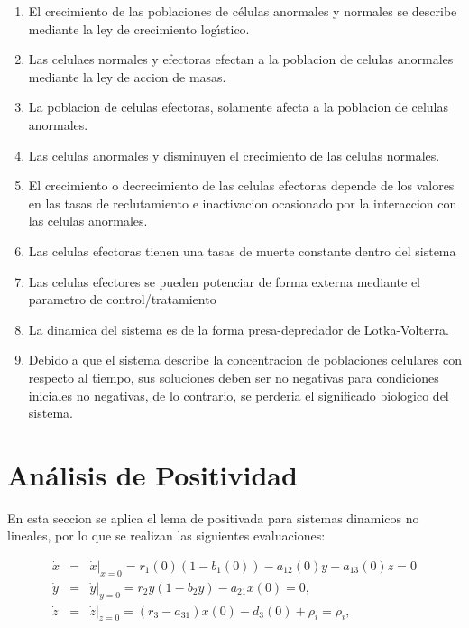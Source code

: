 \documentclass[letterpaper,11pt]{article}
\begin{document}
\begin{enumerate}
\item El crecimiento de las poblaciones de c\'{e}lulas anormales y normales
se describe mediante la ley de crecimiento log\'{\i}stico.

\item Las celulaes normales y efectoras efectan a la poblacion de celulas
anormales mediante la ley de accion de masas.

\item La poblacion de celulas efectoras, solamente afecta a la poblacion de
celulas anormales.

\item Las celulas anormales y disminuyen el crecimiento de las celulas
normales.

\item El crecimiento o decrecimiento de las celulas efectoras depende de los
valores en las tasas de reclutamiento e inactivacion ocasionado por la
interaccion con las celulas anormales.

\item Las celulas efectoras tienen una tasas de muerte constante dentro del
sistema

\item Las celulas efectores se pueden potenciar de forma externa mediante el
parametro de control/tratamiento

\item La dinamica del sistema es de la forma presa-depredador de
Lotka-Volterra.

\item Debido a que el sistema describe la concentracion de poblaciones
celulares con respecto al tiempo, sus soluciones deben ser no negativas para
condiciones iniciales no negativas, de lo contrario, se perderia el
significado biologico del sistema.
\end{enumerate}

\section{An\'{a}lisis de Positividad}

En esta seccion se aplica el lema de positivada para sistemas dinamicos no
lineales, por lo que se realizan las siguientes evaluaciones:

\begin{eqnarray*}
\dot{x} &=&\left. \dot{x}\right\vert
_{x=0}=r_{1}(0)(1-b_{1}(0))-a_{12}(0)y-a_{13}(0)z=0 \\
\dot{y} &=&\left. \dot{y}\right\vert _{y=0}=r_{2}y(1-b_{2}y)-a_{21}x(0)=0, \\
\dot{z} &=&\left. \dot{z}\right\vert _{z=0}=(r_{3}-a_{31})x(0)-d_{3}(0)+\rho
_{i}=\rho _{i},
\end{eqnarray*}
\end{document}

